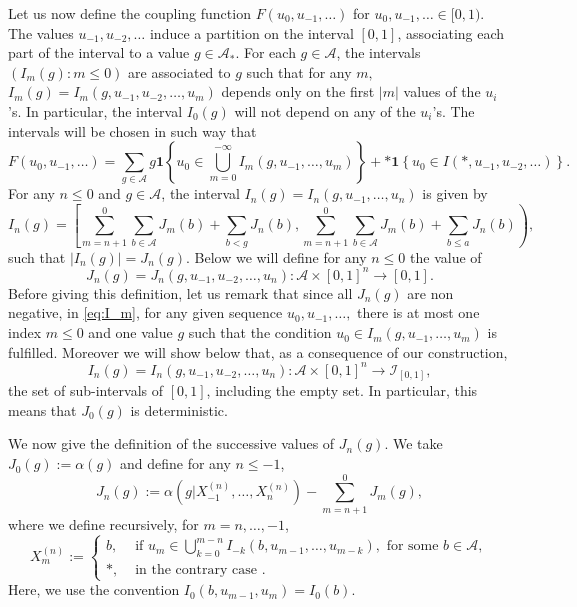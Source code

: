 \documentclass[a4paper]{article}
\newcommand{\A}{\mathcal{A}}
\newcommand{\mydef}{:=}
\begin{document}
\iffalse %
Let us now define the coupling function $F(u_0,u_{-1},\ldots)$ for $u_0, u_{-1}, \ldots \in [0,1)$. The values $u_{-1}, u_{-2}, \ldots$ induce a partition on the interval $[0,1]$, associating each part of the interval to a value $g \in \A_*$. For each $g\in \A$, the intervals 
$
(I_{m}(g): m\leq 0)
$ are associated to $g$ such that for any $m, $ $I_m (g) = I_m(g,  u_{-1},u_{-2},\ldots , u_{m} )$ depends only on the first $|m| $ values of the $u_i$ 's. In particular, the interval $ I_0 ( g) $ will not depend on any of the $u_i$'s. The intervals will be chosen in such way that
\begin{equation}\label{eq:I_m}
F(u_0,u_{-1}, \ldots)=\sum_{g\in \A}g \mathbf{1}\left\{u_0 \in \bigcup_{m=0}^{-\infty}I_{m}(g,u_{-1}, \ldots, u_{m})\right\}+*\mathbf{1}\left\{u_0\in I(*,u_{-1},u_{-2},\ldots)\right\}.
\end{equation}
For any $n\leq 0$ and $g\in \A$, the interval $I_n(g)=I_{n}(g,u_{-1}, \ldots, u_{n})$ is given by 
$$
I_n(g)= \left[\sum_{m=n+1}^{0}\sum_{b\in \A}J_m(b)
 +\sum_{b< g}J_n(b), \sum_{m=n+1}^{0}\sum_{b\in \A}J_m(b)
 +\sum_{b\leq a}J_n(b)\right),
$$
such that $|I_n(g)|=J_n(g)$. Below we will define 
for any $n\leq 0$ the value of  
$$
J_n(g)=J_n(g,u_{-1},u_{-2},\ldots, u_{n}): \A\times [0,1]^n \to [0,1].
$$
Before giving this definition, let us remark that since all $ J_n(g) $ are non negative, in \eqref{eq:I_m}, for any given sequence $u_0,u_{-1}, \ldots,$ there is at most one index $ m \le 0 $ and one value $g$ such that the condition $u_0 \in I_{m}(g,u_{-1}, \ldots, u_{m})$ is fulfilled.  
Moreover we will show below that, as a consequence of our construction, 
$$
I_n(g)=I_n(g,u_{-1},u_{-2},\ldots, u_{n}): \A\times [0,1]^n \to \mathcal{I}_{[0,1]},
$$
the set of sub-intervals of $[0,1]$, including the empty set.
In particular, this means that $J_0(g)$ is deterministic. 

We now give the definition of the successive values of $ J_n (g) .$ We take $J_0(g)\mydef\alpha(g)$ and define for any $n\leq -1$,
$$
J_{n}(g)\mydef\alpha(g|X_{-1}^{(n)},\ldots,X_{n}^{(n)})-\sum_{m=n+1}^0J_{m}(g),
$$
where we define recursively, for $m=n,\ldots, -1$,
$$
X_{m}^{(n)}\mydef
\begin{cases}
b, &\text{ if } u_{m} \in \bigcup_{ k= 0}^{ m-n } I_{ - k } ( b, u_{m-1}, \ldots , u_{ m-k} ), \text{ for some } b\in \A , \\
*, &\text{ in the contrary case }.
\end{cases}
$$
Here, we use the convention $I_0(b,u_{m-1},u_m)=I_0(b)$. 
\end{document}
